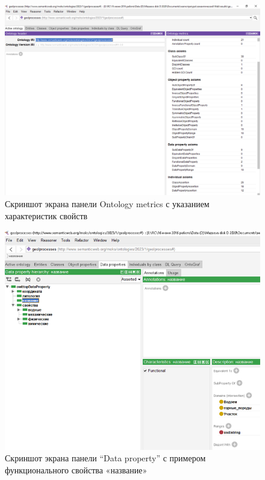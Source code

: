 \documentclass[732,14pt,final]{studrep}
\begin{document}
\begin{center}
  \begin{figure}[htp]
	\centering
	\includegraphics[width=0.9\linewidth]{pics/image19.png}
    \caption{Скриншот экрана панели Ontology metrics с указанием характеристик свойств}
    \label{fig:onto-metrics}
  \end{figure}
\end{center}

\begin{center}
  \begin{figure}[htp]
	\centering
	\includegraphics[width=0.9\linewidth]{pics/image8.png}
    \caption{Скриншот экрана панели “Data property” с примером функционального свойства «название»}
    \label{fig:data-props}
  \end{figure}
\end{center}
\end{document}

